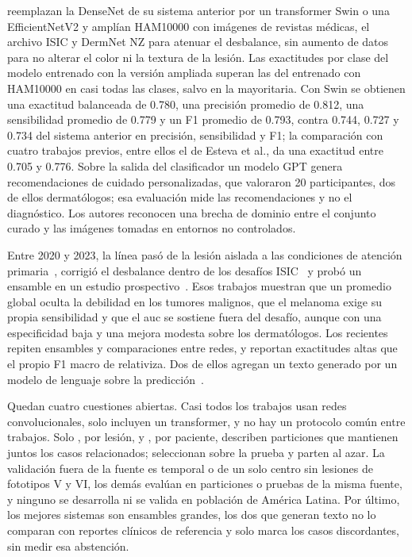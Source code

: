 \textcite{kim2025skinsavvy2} reemplazan la DenseNet de su sistema anterior por un transformer Swin o una EfficientNetV2
y amplían HAM10000 con imágenes de revistas médicas, el archivo ISIC y DermNet NZ para atenuar el desbalance, sin
aumento de datos para no alterar el color ni la textura de la lesión. Las exactitudes por clase del modelo entrenado con
la versión ampliada superan las del entrenado con HAM10000 en casi todas las clases, salvo en la mayoritaria. Con Swin
se obtienen una exactitud balanceada de 0.780, una precisión promedio de 0.812, una sensibilidad promedio de 0.779 y un F1
promedio de 0.793, contra 0.744, 0.727 y 0.734 del sistema anterior en precisión, sensibilidad y F1; la
comparación con cuatro trabajos previos, entre ellos el de Esteva et al., da una exactitud entre 0.705 y 0.776.
Sobre la salida del clasificador un modelo GPT genera recomendaciones de cuidado personalizadas, que valoraron 20
participantes, dos de ellos dermatólogos; esa evaluación mide las recomendaciones y no el diagnóstico. Los autores
reconocen una brecha de dominio entre el conjunto curado y las imágenes tomadas en entornos no controlados.

Entre 2020 y 2023, la línea pasó de la lesión aislada a las condiciones de atención
primaria~\cite{liu2020deep}, corrigió el desbalance dentro de los desafíos ISIC~\cite{gessert2020skin,yao2022single}
y probó un ensamble en un estudio prospectivo~\cite{marchetti2023prospective}. Esos trabajos muestran que un
promedio global oculta la debilidad en los tumores malignos, que el melanoma exige su propia sensibilidad y que el
\gls{auc} se sostiene fuera del desafío, aunque con una especificidad baja y una mejora modesta sobre los
dermatólogos. Los recientes repiten ensambles y comparaciones entre redes, y
reportan exactitudes altas que el propio F1 macro de \textcite{aboulmira2024skinhealthmate} relativiza. Dos de ellos
agregan un texto generado por un modelo de lenguaje sobre la predicción~\cite{khan2025ensemble,kim2025skinsavvy2}.

Quedan cuatro cuestiones abiertas. Casi todos los trabajos usan redes convolucionales, solo
\textcite{kim2025skinsavvy2} incluyen un transformer, y no hay un protocolo común entre trabajos. Solo
\textcite{gessert2020skin}, por lesión, y \textcite{liu2020deep}, por paciente, describen particiones que mantienen
juntos los casos relacionados; \textcite{yao2022single} seleccionan sobre la prueba y \textcite{khan2025ensemble}
parten al azar. La validación fuera de la fuente es temporal o de un solo centro sin lesiones de fototipos V y
VI, los demás evalúan en particiones o pruebas de la misma fuente, y ninguno se desarrolla ni se valida en
población de América Latina. Por último, los mejores sistemas son ensambles grandes, los dos que generan texto no lo
comparan con reportes clínicos de referencia y solo \textcite{khan2025ensemble} marca los casos discordantes, sin
medir esa abstención.

